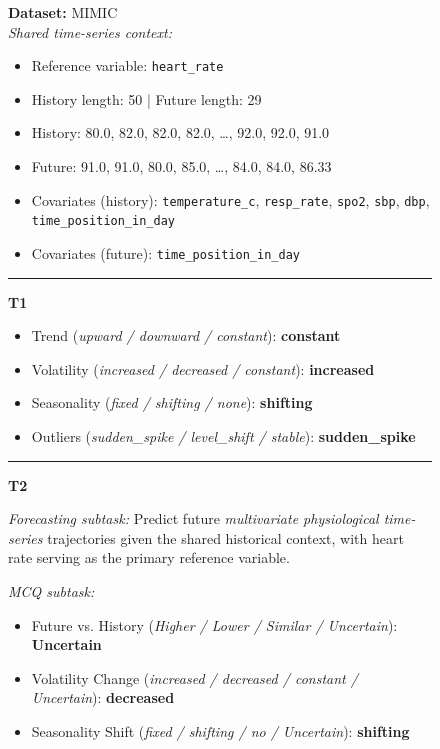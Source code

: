 \begin{figure}[htbp]
\centering
\begin{tcolorbox}[
  colback=gray!6,
  colframe=black!20,
  boxrule=0.5pt,
  arc=3pt,
  left=6pt,right=6pt,top=6pt,bottom=6pt
]
\textbf{Dataset:} MIMIC \\

\emph{Shared time-series context:}
\begin{itemize}[leftmargin=1.1em,itemsep=0pt,topsep=0pt,parsep=0pt,partopsep=0pt]
  \item Reference variable: \texttt{heart\_rate}
  \item History length: 50 \quad | \quad Future length: 29
  \item History: 80.0, 82.0, 82.0, 82.0, \ldots, 92.0, 92.0, 91.0
  \item Future: 91.0, 91.0, 80.0, 85.0, \ldots, 84.0, 84.0, 86.33
  \item Covariates (history):
  \texttt{temperature\_c}, \texttt{resp\_rate}, \texttt{spo2},
  \texttt{sbp}, \texttt{dbp}, \texttt{time\_position\_in\_day}
  \item Covariates (future):
  \texttt{time\_position\_in\_day}
\end{itemize}

\hrule\vspace{4pt}

\textbf{T1}
\begin{itemize}[leftmargin=1.1em,itemsep=0pt,topsep=0pt,parsep=0pt,partopsep=0pt]
  \item Trend (\textit{upward / downward / constant}): \textbf{constant}
  \item Volatility (\textit{increased / decreased / constant}): \textbf{increased}
  \item Seasonality (\textit{fixed / shifting / none}): \textbf{shifting}
  \item Outliers (\textit{sudden\_spike / level\_shift / stable}): \textbf{sudden\_spike}
\end{itemize}

\vspace{3pt}\hrule\vspace{4pt}

\textbf{T2}

\emph{Forecasting subtask:}
Predict future \emph{multivariate physiological time-series} trajectories given the shared historical context, with heart rate serving as the primary reference variable.

\emph{MCQ subtask:}
\begin{itemize}[leftmargin=1.1em,itemsep=0pt,topsep=0pt,parsep=0pt,partopsep=0pt]
  \item Future vs. History
  (\textit{Higher / Lower / Similar / Uncertain}): \textbf{Uncertain}
  \item Volatility Change
  (\textit{increased / decreased / constant / Uncertain}): \textbf{decreased}
  \item Seasonality Shift
  (\textit{fixed / shifting / no / Uncertain}): \textbf{shifting}
\end{itemize}


\end{tcolorbox}
\end{figure}
